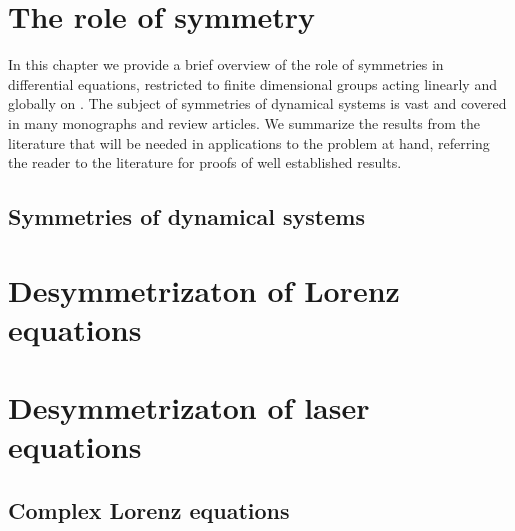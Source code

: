 \chapter{The role of symmetry}\label{chap:Symmetry}

In this chapter we provide a brief overview of the role of
symmetries in differential equations, restricted to finite
dimensional groups acting linearly and globally on . The
subject of symmetries of dynamical systems is vast and covered
in many monographs and review articles. We summarize the
results from the literature that will be needed in applications
to the problem at hand, referring the reader to the literature
for proofs of well established results.

 \section{Symmetries of dynamical systems}
        \label{sec:symIntro}
        



\chapter{Desymmetrizaton of Lorenz equations}
\label{chap:Lorenz}
    

\chapter{Desymmetrizaton of laser equations}
\label{chap:lasers}

 \section{Complex Lorenz equations}
    \label{sec:CLe}
    

